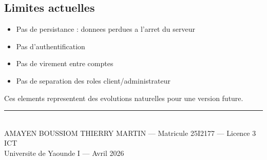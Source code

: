 \documentclass[12pt,a4paper]{article}
\begin{document}
\subsection*{Limites actuelles}

\begin{itemize}[noitemsep]
  \item Pas de persistance : donnees perdues a l'arret du serveur
  \item Pas d'authentification
  \item Pas de virement entre comptes
  \item Pas de separation des roles client/administrateur
\end{itemize}

Ces elements representent des evolutions naturelles pour une version future.

\vfill
\begin{center}
\rule{0.5\linewidth}{0.5pt}\\[0.3cm]
{\small AMAYEN BOUSSIOM THIERRY MARTIN --- Matricule 25I2177 --- Licence 3 ICT\\
Universite de Yaounde I --- Avril 2026}
\end{center}
\end{document}
